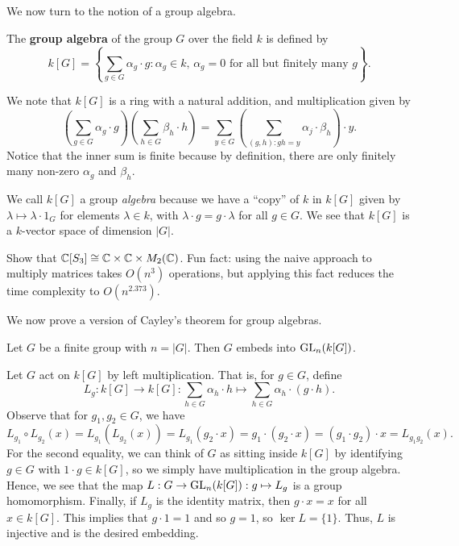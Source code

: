 We now turn to the notion of a group algebra.

\begin{defn}{}
The {\bf group algebra} of the group $G$ over the field $k$ is defined by 
\[ k[G] = \left\{ \sum_{g\in G} \alpha_g \cdot g : \alpha_g \in k,\, \alpha_g = 0 \text{ for all but 
finitely many $g$} \right\}. \]
\end{defn}

We note that $k[G]$ is a ring with a natural addition, and multiplication given by 
\[ \left( \sum_{g\in G} \alpha_g \cdot g \right) \left( \sum_{h \in G} \beta_h \cdot h \right) 
= \sum_{y \in G} \left( \sum_{(g, h) : gh = y} \alpha_j \cdot \beta_h \right) \cdot y. \]
Notice that the inner sum is finite because by definition, there are only finitely many 
non-zero $\alpha_g$ and $\beta_h$. 

\begin{remark}{}
We call $k[G]$ a group {\it algebra} because we have a ``copy'' of $k$ in $k[G]$ given by 
$\lambda \mapsto \lambda \cdot 1_G$ for elements $\lambda \in k$, with $\lambda \cdot g = g 
\cdot \lambda$ for all $g \in G$. We see that $k[G]$ is a $k$-vector space of dimension $|G|$. 
\end{remark}

\begin{exercise}{}
Show that $\mathbb{C}[S_3] \cong \mathbb{C} \times \mathbb{C} \times M_2(\mathbb{C})$. Fun fact: using the naive approach 
to multiply matrices takes $O(n^3)$ operations, but applying this fact reduces the time complexity to 
$O(n^{2.373})$. 
\end{exercise}

We now prove a version of Cayley's theorem for group algebras. 

\begin{prop}{}
Let $G$ be a finite group with $n = |G|$. Then $G$ embeds into $\operatorname{GL}_n(k[G])$. 
\end{prop}
\begin{pf}
Let $G$ act on $k[G]$ by left multiplication. That is, for $g \in G$, define 
\[ L_g : k[G] \to k[G] : \sum_{h\in G} \alpha_h \cdot h \mapsto \sum_{h\in G} \alpha_h \cdot (g \cdot h). \]
Observe that for $g_1, g_2 \in G$, we have 
\[ L_{g_1} \circ L_{g_2}(x) = L_{g_1}(L_{g_2}(x)) = L_{g_1}(g_2 \cdot x) = g_1 \cdot (g_2 \cdot x)
= (g_1 \cdot g_2) \cdot x = L_{g_1g_2}(x). \] 
For the second equality, we can think of $G$ as sitting inside $k[G]$ by identifying 
$g \in G$ with $1 \cdot g \in k[G]$, so we simply have multiplication in the group algebra. 
Hence, we see that the map $L : G \to \operatorname{GL}_n(k[G]) : g \mapsto L_g$ is a group homomorphism. Finally, if 
$L_g$ is the identity matrix, then $g \cdot x = x$ for all $x \in k[G]$. This implies that 
$g \cdot 1 = 1$ and so $g = 1$, so $\ker L = \{1\}$. Thus, $L$ is injective and is the desired embedding.
\end{pf}

